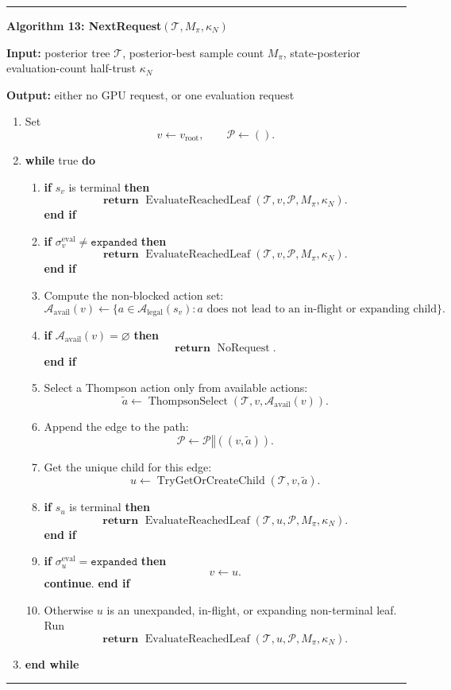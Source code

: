 \documentclass[11pt]{article}
\newcommand{\Tree}{\mathcal{T}}
\newcommand{\Path}{\mathcal{P}}
\newcommand{\Legal}{\mathcal{A}_{\mathrm{legal}}}
\newcommand{\Available}{\mathcal{A}_{\mathrm{avail}}}
\newcommand{\ThompsonSelect}{\operatorname{ThompsonSelect}}
\newcommand{\EvaluateReachedLeaf}{\operatorname{EvaluateReachedLeaf}}
\newcommand{\NoRequest}{\operatorname{NoRequest}}
\newcommand{\TryGetOrCreateChild}{\operatorname{TryGetOrCreateChild}}
\newenvironment{algorithmblock}[1]
{
  \par\medskip
  \noindent\hrule\par\smallskip
  \noindent\textbf{#1}
  \par\smallskip
}
{
  \par\smallskip\noindent\hrule\par\medskip
}
\newcommand{\Input}{\textbf{Input: }}
\newcommand{\Output}{\textbf{Output: }}
\newcommand{\Return}{\textbf{return }}
\newcommand{\If}{\textbf{if }}
\newcommand{\Then}{\textbf{ then }}
\newcommand{\EndIf}{\textbf{end if}}
\newcommand{\While}{\textbf{while }}
\newcommand{\EndWhile}{\textbf{end while}}
\newcommand{\Do}{\textbf{ do }}
\newcommand{\Continue}{\textbf{continue}}
\begin{document}
\begin{algorithmblock}{Algorithm 13: NextRequest\((\Tree,M_\pi,\kappa_N)\)}

\Input posterior tree \(\Tree\), posterior-best sample count \(M_\pi\), state-posterior evaluation-count half-trust \(\kappa_N\)

\Output either no GPU request, or one evaluation request

\begin{enumerate}[leftmargin=2em]
  \item Set
  \[
  v \gets v_{\mathrm{root}},
  \qquad
  \Path \gets ().
  \]

  \item \While true \Do

  \begin{enumerate}[leftmargin=2em]
    \item \If \(s_v\) is terminal \Then
    \[
    \Return
    \EvaluateReachedLeaf(\Tree,v,\Path,M_\pi,\kappa_N).
    \]
    \EndIf

    \item \If \(\sigma^{\mathrm{eval}}_v\ne\texttt{expanded}\) \Then
    \[
    \Return
    \EvaluateReachedLeaf(\Tree,v,\Path,M_\pi,\kappa_N).
    \]
    \EndIf

    \item Compute the non-blocked action set:
    \[
    \Available(v)
    \gets
    \{a\in\Legal(s_v):a\text{ does not lead to an in-flight or expanding child}\}.
    \]

    \item \If \(\Available(v)=\varnothing\) \Then
    \[
    \Return \NoRequest.
    \]
    \EndIf

    \item Select a Thompson action only from available actions:
    \[
    \tilde a
    \gets
    \ThompsonSelect(\Tree,v,\Available(v)).
    \]

    \item Append the edge to the path:
    \[
    \Path
    \gets
    \Path \mathbin{\Vert} ((v,\tilde a)).
    \]

    \item Get the unique child for this edge:
    \[
    u\gets\TryGetOrCreateChild(\Tree,v,\tilde a).
    \]

    \item \If \(s_u\) is terminal \Then
    \[
    \Return
    \EvaluateReachedLeaf(\Tree,u,\Path,M_\pi,\kappa_N).
    \]
    \EndIf

    \item \If \(\sigma^{\mathrm{eval}}_u=\texttt{expanded}\) \Then
    \[
    v\gets u.
    \]
    \Continue.
    \EndIf

    \item Otherwise \(u\) is an unexpanded, in-flight, or expanding non-terminal leaf. Run
    \[
    \Return
    \EvaluateReachedLeaf(\Tree,u,\Path,M_\pi,\kappa_N).
    \]

  \end{enumerate}

  \item \EndWhile
\end{enumerate}

\end{algorithmblock}
\end{document}
